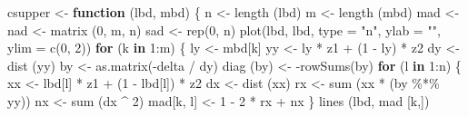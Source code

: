 \documentclass[
  12pt,
  letterpaper,
  DIV=11,
  numbers=noendperiod]{scrreprt}
\newenvironment{Shaded}{\begin{snugshade}}{\end{snugshade}}
\newcommand{\AttributeTok}[1]{\textcolor[rgb]{0.40,0.45,0.13}{#1}}
\newcommand{\ControlFlowTok}[1]{\textcolor[rgb]{0.00,0.23,0.31}{\textbf{#1}}}
\newcommand{\DecValTok}[1]{\textcolor[rgb]{0.68,0.00,0.00}{#1}}
\newcommand{\FunctionTok}[1]{\textcolor[rgb]{0.28,0.35,0.67}{#1}}
\newcommand{\NormalTok}[1]{\textcolor[rgb]{0.00,0.23,0.31}{#1}}
\newcommand{\OtherTok}[1]{\textcolor[rgb]{0.00,0.23,0.31}{#1}}
\newcommand{\SpecialCharTok}[1]{\textcolor[rgb]{0.37,0.37,0.37}{#1}}
\newcommand{\StringTok}[1]{\textcolor[rgb]{0.13,0.47,0.30}{#1}}
\theoremstyle{remark}
\begin{document}
\begin{Shaded}
\begin{Highlighting}[]
\NormalTok{csupper }\OtherTok{\textless{}{-}} \ControlFlowTok{function}\NormalTok{ (lbd, mbd) \{}
\NormalTok{  n }\OtherTok{\textless{}{-}} \FunctionTok{length}\NormalTok{ (lbd)}
\NormalTok{  m }\OtherTok{\textless{}{-}} \FunctionTok{length}\NormalTok{ (mbd)}
\NormalTok{  mad }\OtherTok{\textless{}{-}}\NormalTok{ nad }\OtherTok{\textless{}{-}} \FunctionTok{matrix}\NormalTok{ (}\DecValTok{0}\NormalTok{, m, n)}
\NormalTok{  sad }\OtherTok{\textless{}{-}} \FunctionTok{rep}\NormalTok{(}\DecValTok{0}\NormalTok{, n)}
  \FunctionTok{plot}\NormalTok{(lbd,}
\NormalTok{       lbd,}
       \AttributeTok{type =} \StringTok{"n"}\NormalTok{,}
       \AttributeTok{ylab =} \StringTok{""}\NormalTok{,}
       \AttributeTok{ylim =} \FunctionTok{c}\NormalTok{(}\DecValTok{0}\NormalTok{, }\DecValTok{2}\NormalTok{))}
  \ControlFlowTok{for}\NormalTok{ (k }\ControlFlowTok{in} \DecValTok{1}\SpecialCharTok{:}\NormalTok{m) \{}
\NormalTok{    ly }\OtherTok{\textless{}{-}}\NormalTok{ mbd[k]}
\NormalTok{    yy }\OtherTok{\textless{}{-}}\NormalTok{ ly }\SpecialCharTok{*}\NormalTok{ z1 }\SpecialCharTok{+}\NormalTok{ (}\DecValTok{1} \SpecialCharTok{{-}}\NormalTok{ ly) }\SpecialCharTok{*}\NormalTok{ z2}
\NormalTok{    dy }\OtherTok{\textless{}{-}} \FunctionTok{dist}\NormalTok{ (yy)}
\NormalTok{    by }\OtherTok{\textless{}{-}} \FunctionTok{as.matrix}\NormalTok{(}\SpecialCharTok{{-}}\NormalTok{delta }\SpecialCharTok{/}\NormalTok{ dy)}
    \FunctionTok{diag}\NormalTok{ (by) }\OtherTok{\textless{}{-}} \SpecialCharTok{{-}}\FunctionTok{rowSums}\NormalTok{(by)}
    \ControlFlowTok{for}\NormalTok{ (l }\ControlFlowTok{in} \DecValTok{1}\SpecialCharTok{:}\NormalTok{n) \{}
\NormalTok{      xx }\OtherTok{\textless{}{-}}\NormalTok{ lbd[l] }\SpecialCharTok{*}\NormalTok{ z1 }\SpecialCharTok{+}\NormalTok{ (}\DecValTok{1} \SpecialCharTok{{-}}\NormalTok{ lbd[l]) }\SpecialCharTok{*}\NormalTok{ z2}
\NormalTok{      dx }\OtherTok{\textless{}{-}} \FunctionTok{dist}\NormalTok{ (xx)}
\NormalTok{      rx }\OtherTok{\textless{}{-}} \FunctionTok{sum}\NormalTok{ (xx }\SpecialCharTok{*}\NormalTok{ (by }\SpecialCharTok{\%*\%}\NormalTok{ yy))}
\NormalTok{      nx }\OtherTok{\textless{}{-}} \FunctionTok{sum}\NormalTok{ (dx }\SpecialCharTok{\^{}} \DecValTok{2}\NormalTok{)}
\NormalTok{      mad[k, l] }\OtherTok{\textless{}{-}} \DecValTok{1} \SpecialCharTok{{-}} \DecValTok{2} \SpecialCharTok{*}\NormalTok{ rx }\SpecialCharTok{+}\NormalTok{ nx}
\NormalTok{    \}}
    \FunctionTok{lines}\NormalTok{ (lbd, mad [k,])}

\end{Highlighting}
\end{Shaded}
\end{document}
